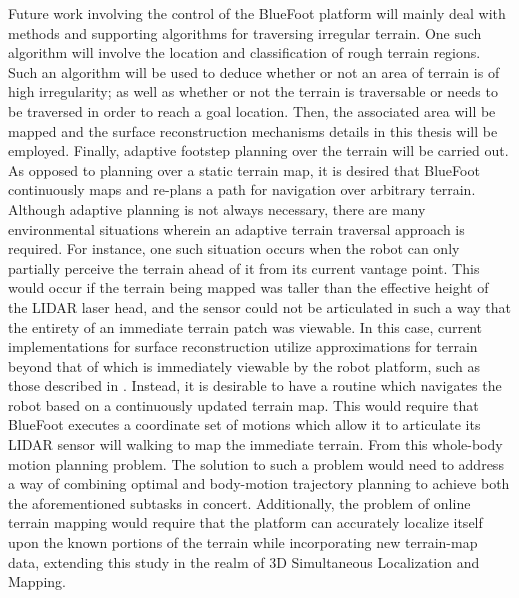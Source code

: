 Future work involving the control of the BlueFoot platform will mainly deal with methods and supporting algorithms for traversing irregular terrain.  One such algorithm will involve the location and classification of rough terrain regions. Such an algorithm will be used to deduce whether or not an area of terrain is of high irregularity; as well as whether or not the terrain is traversable or needs to be traversed in order to reach a goal location. Then, the associated area will be mapped and the surface reconstruction mechanisms details in this thesis will be employed. Finally, adaptive footstep planning over the terrain will be carried out. As opposed to planning over a static terrain map, it is desired that BlueFoot continuously maps and re-plans a path for navigation over arbitrary terrain. Although adaptive planning is not always necessary, there are many environmental situations wherein an adaptive terrain traversal approach is required. For instance, one such situation occurs when the robot can only partially perceive the terrain ahead of it from its current vantage point. This would occur if the terrain being mapped was taller than the effective height of the LIDAR laser head, and the sensor could not be articulated in such a way that the entirety of an immediate terrain patch was viewable. In this case, current implementations for surface reconstruction utilize approximations for terrain beyond that of which is immediately viewable by the robot platform, such as those described in \cite{other dudes}. Instead, it is desirable to have a routine which navigates the robot based on a continuously updated terrain map. This would require that BlueFoot executes a coordinate set of motions which allow it to articulate its LIDAR sensor will walking to map the immediate terrain. From this whole-body motion planning problem. The solution to such a problem would need to address a way of combining optimal and body-motion trajectory planning to achieve both the aforementioned subtasks in concert. Additionally, the problem of online terrain mapping would require that the platform can accurately localize itself upon the known portions of the terrain while incorporating new terrain-map data, extending this study in the realm of 3D Simultaneous Localization and Mapping.
